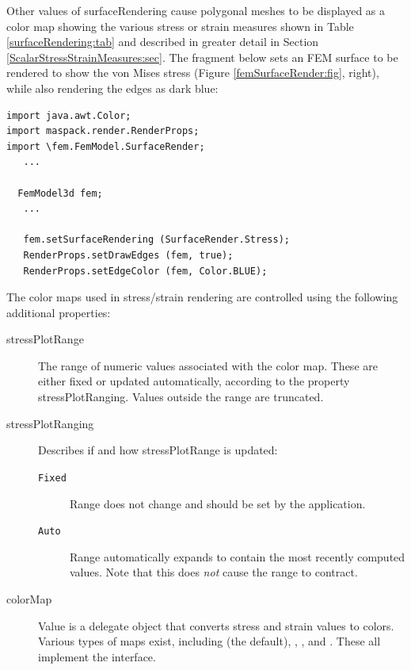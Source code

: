 %
Other values of {\sf surfaceRendering} cause polygonal meshes to be
displayed as a color map showing the various stress or strain measures
shown in Table \ref{surfaceRendering:tab} and described in greater
detail in Section \ref{ScalarStressStrainMeasures:sec}.  The fragment
below sets an FEM surface to be rendered to show the von Mises stress
(Figure \ref{femSurfaceRender:fig}, right), while also rendering the
edges as dark blue:
%
\begin{lstlisting}[]
import java.awt.Color;
import maspack.render.RenderProps;
import \fem.FemModel.SurfaceRender;
   ...

  FemModel3d fem;
   ...

   fem.setSurfaceRendering (SurfaceRender.Stress);
   RenderProps.setDrawEdges (fem, true);
   RenderProps.setEdgeColor (fem, Color.BLUE);
\end{lstlisting}
%
The color maps used in stress/strain rendering are controlled using
the following additional properties:

\begin{description}

\item[stressPlotRange]\mbox{}

The range of numeric values associated with the color map. These are
either fixed or updated automatically, according to the property {\sf
stressPlotRanging}.  Values outside the range are truncated.

\item[stressPlotRanging]\mbox{}

Describes if and how {\sf stressPlotRange} is updated:

\begin{description}

\item[{\tt Fixed}]\mbox{}

Range does not change and should be set by the application.

\item[{\tt Auto}]\mbox{}

Range automatically expands to contain the most recently computed
values. Note that this does {\it not} cause the range to contract.

\end{description}

\item[colorMap]\mbox{}

Value is a delegate object that converts stress and strain values to
colors. Various types of maps exist, including
 (the default),
,
, and
.  These all implement the
 interface.

\end{description}

